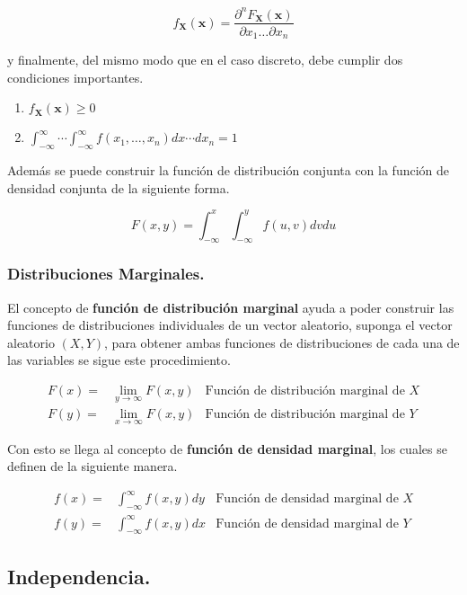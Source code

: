 \begin{equation}
	f_\mathbf{X}(\mathbf{x}) = \frac{\partial^n F_\mathbf{X}(\mathbf{x})}{\partial x_1 \dots \partial x_n}
\end{equation}

y finalmente, del mismo modo que en el caso discreto, debe cumplir dos condiciones importantes.

\begin{enumerate}
	\item $f_\mathbf{X}(\mathbf{x}) \geq 0$
	\item $\int_{-\infty}^\infty\cdots\int_{-\infty}^\infty f(x_1,\dots, x_n) dx\cdots dx_n = 1$
\end{enumerate}

Además se puede construir la función de distribución conjunta con la función de densidad conjunta de la siguiente forma.

\begin{equation}
	F(x,y) = \int_{-\infty}^x\int_{-\infty}^y f(u,v)dvdu
\end{equation}

\subsubsection{Distribuciones Marginales.}

El concepto de \textbf{función de distribución marginal} ayuda a poder construir las funciones de distribuciones individuales de un vector aleatorio, suponga el vector aleatorio $(X,Y)$, para obtener ambas funciones de distribuciones de cada una de las variables se sigue este procedimiento.

\begin{align}
	F(x) =& \lim_{y\to \infty} F(x,y)& \text{Función de distribución marginal de } X\\
	F(y) =& \lim_{x\to \infty} F(x,y)& \text{Función de distribución marginal de } Y
\end{align}

Con esto se llega al concepto de \textbf{función de densidad marginal}, los cuales se definen de la siguiente manera.

\begin{align}
	f(x) =& \int_{-\infty}^\infty f(x,y) dy &\text{Función de densidad marginal de } X\\
	f(y) =& \int_{-\infty}^\infty f(x,y) dx &\text{Función de densidad marginal de } Y
\end{align}

\subsection{Independencia.}

